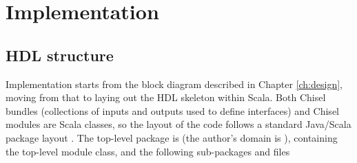 \chapter{Implementation}
\label{ch:implementation}

\section{HDL structure}
Implementation starts from the block diagram described in Chapter \ref{ch:design}, moving from that to laying out the HDL skeleton within Scala. Both Chisel bundles (collections of inputs and outputs used to define interfaces) and Chisel modules are Scala classes, so the layout of the code follows a standard Java/Scala package layout \cite{scala_style}. The top-level package is  (the author's domain is ), containing the top-level  module class, and the following sub-packages and files

